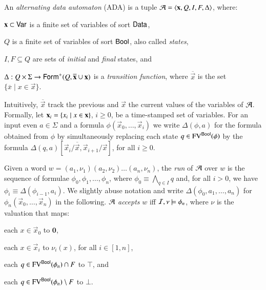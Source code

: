 \documentclass{llncs}
\begin{document}
An \emph{alternating data automaton} (ADA) is a tuple $\mathcal{A} =
\left\langle \mathbf x,Q,I,F,\Delta \right\rangle$, where: \begin{compactitem}
%
\item $\mathbf x \subset \mathsf{Var}$ is a finite set of variables of sort
  $\mathsf{Data}$,
%
\item $Q$ is a finite set of variables of sort $\mathsf{Bool}$, also called
  \emph{states},
%
\item $I,F \subseteq Q$ are sets of \emph{initial} and \emph{final}
  states, and
%
\item $\Delta : Q \times \Sigma \rightarrow
  \mathsf{Form}^+(Q,\overline{\mathbf x}\cup\mathbf x)$ is a \emph{transition
    function}, where $\overline{\vec{x}}$ is the set $\{\overline{x}
  \mid x \in \vec{x}\}$.
\end{compactitem}
Intuitively, $\overline{\vec{x}}$ track the previous and $\vec{x}$ the
current values of the variables of $\mathcal{A}$. Formally, let $\mathbf x_i =
\left\{ x_i \mid x \in \mathbf x \right\}$, $i\geq0$, be a time-stamped set of
variables. For an input even $a \in \Sigma$ and a formula
$\phi(\vec{x}_0,\ldots,\vec{x}_i)$ we write $\Delta(\phi,a)$ for the
formula obtained from $\phi$ by simultaneously replacing each state $q
\in \mathrm{FV}^{\mathsf{Bool}}(\phi)$ by the formula
$\Delta(q,a)[\vec{x}_i/\overline{\vec{x}},\vec{x}_{i+1}/\vec{x}]$, for
all $i\geq0$.

Given a word $w = (a_1,\nu_1)(a_2,\nu_2) \ldots (a_n,\nu_n)$, the
\emph{run} of $\mathcal{A}$ over $w$ is the sequence of formulae
$\phi_0,\phi_1,\ldots,\phi_n$, where $\phi_0 \equiv \bigwedge_{q \in
  I} q$ and, for all $i > 0$, we have $\phi_i \equiv
\Delta(\phi_{i-1},a_i)$. We slightly abuse notation and write
$\Delta(\phi_0,a_1,\ldots,a_n)$ for
$\phi_n(\vec{x}_0,\ldots,\vec{x}_n)$ in the following. $\mathcal{A}$ 
\emph{accepts} $w$ iff $\mathcal{I},\nu \models \phi_n$, where $\nu$ is the
valuation that maps:\begin{inparaenum}[(1)] 
\item each $x \in \vec{x}_0$ to $\mathbf{0}$, 
%
\item each $x \in \vec{x}_i$ to $\nu_i(x)$, for all $i \in [1,n]$, 
%
\item each $q \in \mathrm{FV}^{\mathsf{Bool}}(\phi_n) \cap F$ to $\top$, and 
%
\item each $q \in \mathrm{FV}^{\mathsf{Bool}}(\phi_n) \setminus F$ to $\bot$.
\end{inparaenum}

\end{document}

